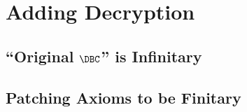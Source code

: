 \chapter{Adding Decryption}\label{chap:adding-decryption}

\section{``Original \texorpdfstring{$\DBC$}{DBC}'' is Infinitary}\label{sec:orig-dbc-infinitary}

\section{Patching Axioms to be Finitary}\label{sec:patch-finitary}

